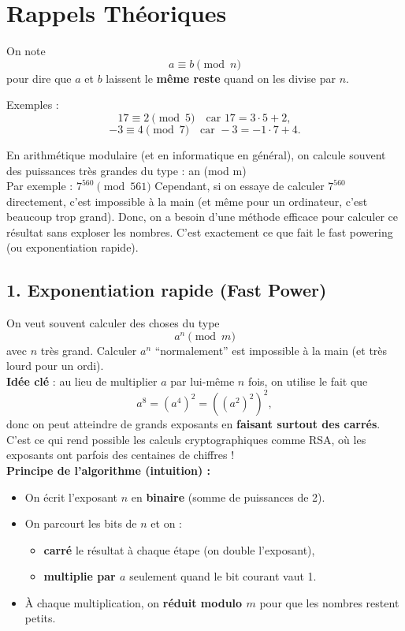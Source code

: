 
\section*{Rappels Théoriques}

On note
\[
a \equiv b \pmod{n}
\]
pour dire que $a$ et $b$ laissent le \textbf{même reste} quand on les divise par $n$.

Exemples :
\[
17 \equiv 2 \pmod{5} \quad\text{car } 17 = 3\cdot 5 + 2,
\]
\[
-3 \equiv 4 \pmod{7} \quad\text{car } -3 = -1\cdot 7 + 4.
\]

En arithmétique modulaire (et en informatique en général), on calcule souvent des puissances très grandes du type : an (mod m) \\

Par exemple : $7^{560} \pmod {561} $
Cependant, si on essaye de calculer $7^{560}$ directement, c’est impossible à la main (et même pour un ordinateur, c’est beaucoup trop grand). Donc, on a besoin d’une méthode efficace pour calculer ce résultat sans exploser les nombres. C’est exactement ce que fait le fast powering (ou exponentiation rapide). \\


\subsection*{1. Exponentiation rapide (Fast Power)}
On veut souvent calculer des choses du type
\[
a^n \pmod{m}
\]
avec $n$ très grand. Calculer $a^n$ “normalement” est impossible à la main (et très lourd pour un ordi). \\

\textbf{Idée clé} : au lieu de multiplier $a$ par lui-même $n$ fois, on utilise le fait que
\[
a^8 = (a^4)^2 = ((a^2)^2)^2,
\]
donc on peut atteindre de grands exposants en \textbf{faisant surtout des carrés}. C’est ce qui rend possible les calculs cryptographiques comme RSA, où les exposants ont parfois des centaines de chiffres ! \\


\textbf{Principe de l’algorithme (intuition) :}
\begin{itemize}
    \item On écrit l’exposant $n$ en \textbf{binaire} (somme de puissances de 2).
    \item On parcourt les bits de $n$ et on :
        \begin{itemize}
            \item \textbf{carré} le résultat à chaque étape (on double l’exposant),
            \item \textbf{multiplie par $a$} seulement quand le bit courant vaut 1.
        \end{itemize}
        \item À chaque multiplication, on \textbf{réduit modulo $m$} pour que les nombres restent petits. \\
\end{itemize}

